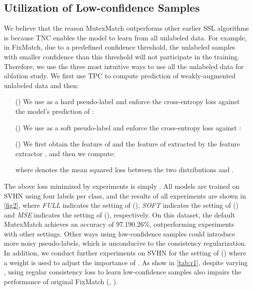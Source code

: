 \documentclass[lettersize,journal]{IEEEtran}
\theoremstyle{plain}
\theoremstyle{definition}
\theoremstyle{remark}
\begin{document}
\subsection{Utilization of Low-confidence Samples}
\label{sec:uls}
We believe that the reason MutexMatch outperforms other earlier SSL algorithms is because TNC enables the model to learn from all unlabeled data. 
For example, in FixMatch, due to a predefined confidence threshold, the unlabeled samples with smaller confidence than this threshold will not participate in the training. 
Therefore, we use the three most intuitive ways to use all the unlabeled data for ablation study.
We first use TPC to compute prediction  of weakly-augmented unlabeled data  and then:
\begin{enumerate}
  \item [(\romannumeral1)] 
  We use  as a hard pseudo-label and enforce the cross-entropy loss against the model’s prediction  of : 
       
  \item [(\romannumeral2)]
  We use  as a soft pseudo-label and enforce the cross-entropy loss against :

  \item [(\romannumeral3)]
  We first obtain the feature  of  and the feature  of  extracted by the feature extractor , and then we compute:

where  denotes the mean squared loss between the two distributions  and .
\end{enumerate}
The above loss  minimized by experiments is simply . 
All models are trained on SVHN using four labels per class, and  the results of all experiments are shown in \cref{fig2}, where \textit{FULL} indicates the setting of (), \textit{SOFT} indicates the setting of () and \textit{MSE} indicates the setting of (), respectively.
On this dataset, the default MutexMatch achieves an accuracy of 97.190.26\%, outperforming experiments with other settings. Other ways using low-confidence samples could introduce more noisy pseudo-labels, which is unconducive to the consistency regularization. 
In addition, we conduct further experiments on SVHN for the setting of () where a weight  is used to adjust the importance of . As show in \cref{tab:r1}, despite varying , using regular consistency loss to learn low-confidence samples also impairs the performance of original FixMatch (\ie, ).
\end{document}
